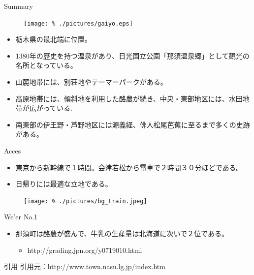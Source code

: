 \documentclass[]{beamer}
\begin{document}
\normalsize


\begin{frame}{Summary}
  \begin{figure}[gaiyo]
    \begin{center}
    \texttt{[image: \%
      ./pictures/gaiyo.eps]}
    \end{center}
  \end{figure}
  
  \begin{itemize}
  \item 栃木県の最北端に位置。\\
  \item 1380年の歴史を持つ温泉があり、日光国立公園「那須温泉郷」として観光の名所となっている。\\
  \item 山麓地帯には、別荘地やテーマーパークがある。\\
  \item 高原地帯には、傾斜地を利用した酪農が続き、中央・東部地区には、水田地帯が広がっている.\\
  \item 南東部の伊王野・芦野地区には源義経、俳人松尾芭蕉に至るまで多くの史跡がある。\\
  \end{itemize}
  
\end{frame}
\begin{frame}{Acces}
  \begin{itemize}
  \item 東京から新幹線で１時間。会津若松から電車で２時間３０分ほどである。\\
  \item 日帰りには最適な立地である。\\
  \end{itemize}
   \begin{figure}[map]
    \begin{center}
    \texttt{[image: \%
      ./pictures/bg\_train.jpeg]}
    \end{center}
  \end{figure}
\end{frame}

\begin{frame}{We'er No.1}
  \begin{itemize}
  \item 那須町は酪農が盛んで、牛乳の生産量は北海道に次いで２位である。\\
    \begin{itemize}
    \item http://grading.jpn.org/y0719010.html\\
    \end{itemize}
  \end{itemize}
  
\end{frame}
\begin{frame}{引用}
  引用元：http://www.town.nasu.lg.jp/index.htm\\
\end{frame}
\end{document}
